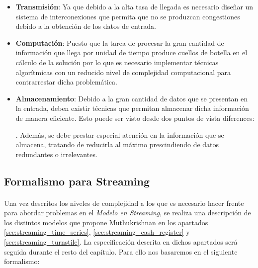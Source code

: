 \documentclass{subfiles}
\begin{document}
      \begin{itemize}

        \item \textbf{Transmisión}: Ya que debido a la alta tasa de llegada es necesario diseñar un sistema de interconexiones que permita que no se produzcan congestiones debido a la obtención de los datos de entrada.

        \item \textbf{Computación}: Puesto que la tarea de procesar la gran cantidad de información que llega por unidad de tiempo produce cuellos de botella en el cálculo de la solución por lo que es necesario implementar técnicas algorítmicas con un reducido nivel de complejidad computacional para contrarrestar dicha problemática.

        \item \textbf{Almacenamiento}: Debido a la gran cantidad de datos que se presentan en la entrada, deben existir técnicas que permitan almacenar dicha información de manera eficiente. Esto puede ser visto desde dos puntos de vista diferences: . Además, se debe prestar especial atención en la información que se almacena, tratando de reducirla al máximo prescindiendo de datos redundantes o irrelevantes.

      \end{itemize}

      \subsection{Formalismo para Streaming}
      \label{sec:streaming_formalism}

        \paragraph{}
        Una vez descritos los niveles de complejidad a los que es necesario hacer frente para abordar problemas en el \emph{Modelo en Streaming}, se realiza una descripción de los distintos modelos que propone Muthukrishnan \cite{Muthukrishnan:2005:DSA:1166409.1166410} en los apartados \ref{sec:streaming_time_series}, \ref{sec:streaming_cash_register} y \ref{sec:streaming_turnstile}. La especificación descrita en dichos apartados será seguida durante el resto del capítulo. Para ello nos basaremos en el siguiente formalismo:
\end{document}
